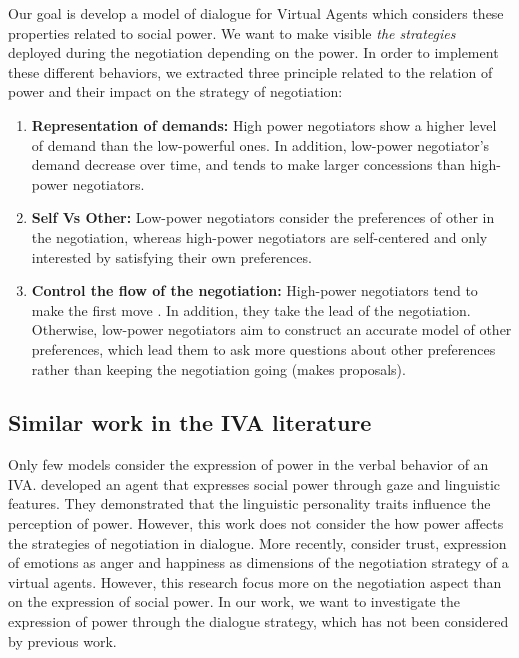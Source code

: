 \documentclass{llncs}
\begin{document}
		Our goal is develop a model of dialogue for Virtual Agents which considers these properties related to social power. We want to make visible \emph{the strategies} deployed during the negotiation depending on the power. In order to implement these different behaviors, we extracted three principle related to the relation of power and their impact on the strategy of negotiation:
		\begin{enumerate}
			\item \textbf{Representation of demands:} High power negotiators show a higher level of demand than the low-powerful ones. In addition,  low-power negotiator's demand decrease over time, and tends to make larger concessions than high-power negotiators. \cite{de1995impact}
			
			\item \textbf{Self Vs Other:} Low-power negotiators consider the preferences of other in the negotiation, whereas high-power negotiators are self-centered and only interested by satisfying their own preferences. \cite{fiske1993controlling,de1995impact}
			
			\item \textbf{Control the flow of the negotiation:}
			High-power negotiators tend to make the first move \cite{magee2007power}. In addition, they take the lead of the negotiation. Otherwise, low-power negotiators aim to construct an accurate model of other preferences, which lead them to ask more questions about other preferences rather than keeping the negotiation going (makes proposals)\cite{de2004influence}. 
			
		\end{enumerate}
		\subsection{Similar work in the IVA literature}
		Only few models consider the expression of power in the verbal behavior of an IVA. \cite{bee2010bossy} developed an agent that expresses social power through gaze and linguistic features. They demonstrated that the linguistic personality traits influence the perception of power. However, this work does not consider the how power affects the strategies of negotiation in dialogue. More recently, \cite{traum2008multi,de2015humans} consider trust, expression of emotions as anger and happiness as dimensions of the negotiation strategy of a virtual agents. However, this research focus more on the negotiation aspect than on the expression of social power. In our work, we want to investigate the expression of power through the dialogue strategy, which has not been considered by previous work.
		
\end{document}

